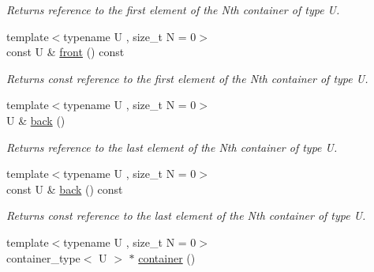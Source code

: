 \begin{DoxyCompactItemize}
\begin{DoxyCompactList}\small\item\em Returns reference to the first element of the Nth container of type U. \end{DoxyCompactList}\item 
\hypertarget{classheterogeneous_1_1heterodeque_3_01_t_00_01_types_8_8_8_4_afdd95bbbf855440608d05bad1208900e}{}{\footnotesize template$<$typename U , size\+\_\+t N = 0$>$ }\\const U \& \hyperlink{classheterogeneous_1_1heterodeque_3_01_t_00_01_types_8_8_8_4_afdd95bbbf855440608d05bad1208900e}{front} () const \label{classheterogeneous_1_1heterodeque_3_01_t_00_01_types_8_8_8_4_afdd95bbbf855440608d05bad1208900e}

\begin{DoxyCompactList}\small\item\em Returns const reference to the first element of the Nth container of type U. \end{DoxyCompactList}\item 
\hypertarget{classheterogeneous_1_1heterodeque_3_01_t_00_01_types_8_8_8_4_a221334cf963a827fb38ade46797ccae5}{}{\footnotesize template$<$typename U , size\+\_\+t N = 0$>$ }\\U \& \hyperlink{classheterogeneous_1_1heterodeque_3_01_t_00_01_types_8_8_8_4_a221334cf963a827fb38ade46797ccae5}{back} ()\label{classheterogeneous_1_1heterodeque_3_01_t_00_01_types_8_8_8_4_a221334cf963a827fb38ade46797ccae5}

\begin{DoxyCompactList}\small\item\em Returns reference to the last element of the Nth container of type U. \end{DoxyCompactList}\item 
\hypertarget{classheterogeneous_1_1heterodeque_3_01_t_00_01_types_8_8_8_4_af623e682c64756597a7bc044b7ee9405}{}{\footnotesize template$<$typename U , size\+\_\+t N = 0$>$ }\\const U \& \hyperlink{classheterogeneous_1_1heterodeque_3_01_t_00_01_types_8_8_8_4_af623e682c64756597a7bc044b7ee9405}{back} () const \label{classheterogeneous_1_1heterodeque_3_01_t_00_01_types_8_8_8_4_af623e682c64756597a7bc044b7ee9405}

\begin{DoxyCompactList}\small\item\em Returns const reference to the last element of the Nth container of type U. \end{DoxyCompactList}\item 
\hypertarget{classheterogeneous_1_1heterodeque_3_01_t_00_01_types_8_8_8_4_a09b9bb24d659c9dbf0a833f2d9f4909e}{}{\footnotesize template$<$typename U , size\+\_\+t N = 0$>$ }\\container\+\_\+type$<$ U $>$ $\ast$ \hyperlink{classheterogeneous_1_1heterodeque_3_01_t_00_01_types_8_8_8_4_a09b9bb24d659c9dbf0a833f2d9f4909e}{container} ()\label{classheterogeneous_1_1heterodeque_3_01_t_00_01_types_8_8_8_4_a09b9bb24d659c9dbf0a833f2d9f4909e}


\end{DoxyCompactItemize}
